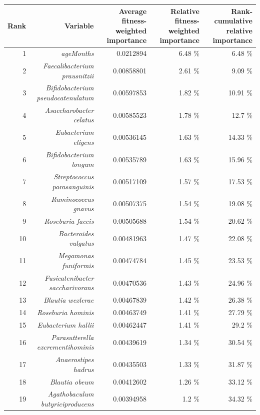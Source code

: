 \documentclass{article}
\begin{document}
  \begin{table}
    \begin{tabular}{|r|r|r|r|r|}
      \hline\hline
      \textbf{Rank} & \textbf{Variable} & \textbf{Average fitness-weighted importance} & \textbf{Relative fitness-weighted importance} & \textbf{Rank-cumulative relative importance } \\\hline
      1 & \textit{ageMonths} & 0.0212894 & 6.48 \% & 6.48 \% \\
      2 & \textit{Faecalibacterium prausnitzii} & 0.00858801 & 2.61 \% & 9.09 \% \\
      3 & \textit{Bifidobacterium pseudocatenulatum} & 0.00597853 & 1.82 \% & 10.91 \% \\
      4 & \textit{Asaccharobacter celatus} & 0.00585523 & 1.78 \% & 12.7 \% \\
      5 & \textit{Eubacterium eligens} & 0.00536145 & 1.63 \% & 14.33 \% \\
      6 & \textit{Bifidobacterium longum} & 0.00535789 & 1.63 \% & 15.96 \% \\
      7 & \textit{Streptococcus parasanguinis} & 0.00517109 & 1.57 \% & 17.53 \% \\
      8 & \textit{Ruminococcus gnavus} & 0.00507375 & 1.54 \% & 19.08 \% \\
      9 & \textit{Roseburia faecis} & 0.00505688 & 1.54 \% & 20.62 \% \\
      10 & \textit{Bacteroides vulgatus} & 0.00481963 & 1.47 \% & 22.08 \% \\
      11 & \textit{Megamonas funiformis} & 0.00474784 & 1.45 \% & 23.53 \% \\
      12 & \textit{Fusicatenibacter saccharivorans} & 0.00470536 & 1.43 \% & 24.96 \% \\
      13 & \textit{Blautia wexlerae} & 0.00467839 & 1.42 \% & 26.38 \% \\
      14 & \textit{Roseburia hominis} & 0.00463749 & 1.41 \% & 27.79 \% \\
      15 & \textit{Eubacterium hallii} & 0.00462447 & 1.41 \% & 29.2 \% \\
      16 & \textit{Parasutterella excrementihominis} & 0.00439619 & 1.34 \% & 30.54 \% \\
      17 & \textit{Anaerostipes hadrus} & 0.00435503 & 1.33 \% & 31.87 \% \\
      18 & \textit{Blautia obeum} & 0.00412602 & 1.26 \% & 33.12 \% \\
      19 & \textit{Agathobaculum butyriciproducens} & 0.00394958 & 1.2 \% & 34.32 \% \\

\end{tabular}
\end{table}
\end{document}
